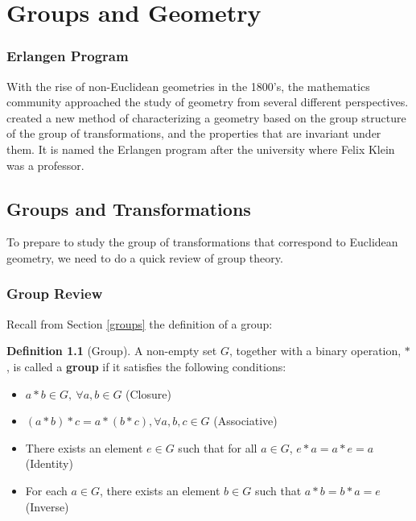 \documentclass[
]{book}
\providecommand{\tightlist}{%
  \setlength{\itemsep}{0pt}\setlength{\parskip}{0pt}}
\let\stdsection\section
\renewcommand\section{\newpage\stdsection}
\theoremstyle{definition}
\newtheorem{definition}{Definition}[chapter]
\theoremstyle{definition}
\theoremstyle{definition}
\theoremstyle{definition}
\theoremstyle{remark}
\begin{document}
\hypertarget{algebraic-geometry}{%
\chapter{Groups and Geometry}\label{algebraic-geometry}}

\hypertarget{erlangen-program}{%
\subsection*{Erlangen Program}\label{erlangen-program}}

With the rise of non-Euclidean geometries in the 1800's, the mathematics community approached the study of geometry from several different perspectives. \citet{Klein1872} created a new method of characterizing a geometry based on the group structure of the group of transformations, and the properties that are invariant under them. It is named the Erlangen program after the university where Felix Klein was a professor.

\hypertarget{groups-and-transformations}{%
\section{Groups and Transformations}\label{groups-and-transformations}}

To prepare to study the group of transformations that correspond to Euclidean geometry, we need to do a quick review of group theory.

\hypertarget{group-review}{%
\subsection{Group Review}\label{group-review}}

Recall from Section \ref{groups} the definition of a group:

\begin{definition}[Group]

A non-empty set \(G\), together with a binary operation, \(*\), is called a \textbf{group} if it satisfies the following conditions:

\begin{itemize}
\tightlist
\item
  \(a*b \in G, \: \forall a,b \in G\) (Closure)
\item
  \((a*b)*c = a * (b*c), \forall a,b,c \in G\) (Associative)
\item
  There exists an element \(e \in G\) such that for all \(a\in G\), \(e*a=a*e=a\) (Identity)
\item
  For each \(a\in G\), there exists an element \(b\in G\) such that \(a*b=b*a=e\) (Inverse)
\end{itemize}

\end{definition}
\end{document}
